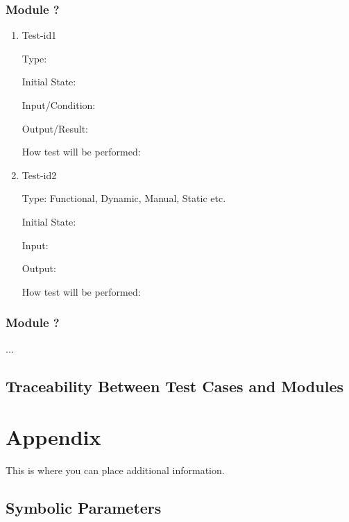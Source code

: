 \documentclass[12pt, titlepage]{article}
\begin{document}
\subsubsection{Module ?}
		
\begin{enumerate}

\item{Test-id1\\}

Type: 
					
Initial State: 
					
Input/Condition: 
					
Output/Result: 
					
How test will be performed: 
					
\item{Test-id2\\}

Type: Functional, Dynamic, Manual, Static etc.
					
Initial State: 
					
Input: 
					
Output: 
					
How test will be performed: 

\end{enumerate}

\subsubsection{Module ?}

...

\subsection{Traceability Between Test Cases and Modules}

				

\newpage

\section{Appendix}

This is where you can place additional information.

\subsection{Symbolic Parameters}
\end{document}
